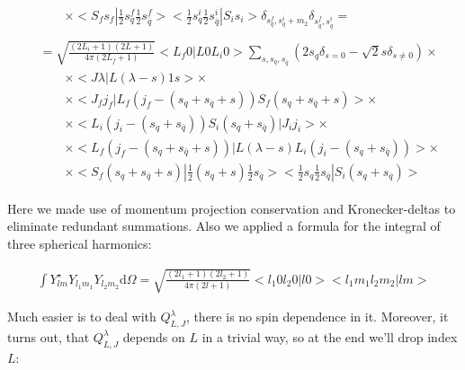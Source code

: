 \begin{align}
\begin{split}
        &\qquad\times <S_f s_f| \frac{1}{2} s^f_{q} \frac{1}{2} s^f_{\overline{q}}> <\frac{1}{2} s^i_{q} \frac{1}{2} s^i_{\overline{q}} |S_i s_i> \delta_{s^f_{q}, s^{i}_{q} + m_2} \delta_{s^f_{\overline{q}}, s^i_{\overline{q}}} =
    \end{split} \\
    \begin{split}
        &= \sqrt{\frac{(2L_i + 1)(2L+1)}{4 \pi (2L_f + 1)}} < L_f 0 | L 0 L_i 0 > \sum_{s, s_{q}, s_{\overline{q}}} (2 s_q \delta_{s = 0} - \sqrt{2} s \delta_{s \neq 0}) \times \\
    &\qquad\times <J \lambda| L (\lambda - s) 1 s> \times \\
    &\qquad\times <J_f j_f| L_f (j_f-(s_q + s_{\overline{q}} + s)) S_f (s_q + s_{\overline{q}} + s)> \times \\
        &\qquad\times <L_i (j_i - (s_q + s_{\overline{q}})) S_i (s_q + s_{\overline{q}})| J_i j_i> \times \\
        &\qquad\times <L_f (j_f - (s_q + s_{\overline{q}} + s))| L (\lambda - s) L_i (j_i - (s_q + s_{\overline{q}}))>  \times\\
        &\qquad\times <S_f (s_q + s_{\overline{q}} + s)| \frac{1}{2} (s_{q}+s) \frac{1}{2} s_{\overline{q}}> <\frac{1}{2} s_{q} \frac{1}{2} s_{\overline{q}} |S_i (s_q + s_{\overline{q}})>
    \end{split}
\end{align}

Here we made use of momentum projection conservation and Kronecker-deltas to eliminate redundant summations. Also we applied a formula for the integral of three spherical harmonics:

\begin{align}
    \int Y^{\star}_{l m} Y_{l_1 m_1} Y_{l_2 m_2} \mathrm{d} \Omega = \sqrt{\frac{(2l_1+1)(2l_2+1)}{4 \pi (2l+1)}} <l_1 0 l_2 0 | l 0> <l_1 m_1 l_2 m_2 | l m>
\end{align}

Much easier is to deal with $Q_{L, J}^\lambda$, there is no spin dependence in it. Moreover, it turns out, that $Q_{L, J}^{\lambda}$ depends on $L$ in a trivial way, so at the end we'll drop index $L$:

